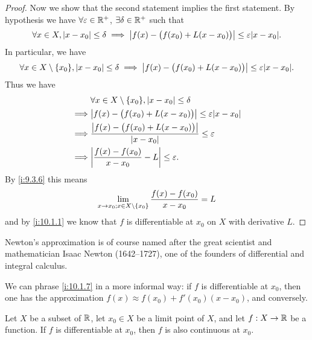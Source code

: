 \begin{proof}
  Now we show that the second statement implies the first statement.
  By hypothesis we have \(\forall \varepsilon \in \mathbb{R}^+\), \(\exists \delta \in \mathbb{R}^+\) such that
  \[
    \forall x \in X, \abs{x - x_0} \leq \delta \implies \abs{f(x) - \big(f(x_0) + L(x - x_0)\big)} \leq \varepsilon \abs{x - x_0}.
  \]
  In particular, we have
  \[
    \forall x \in X \setminus \set{x_0}, \abs{x - x_0} \leq \delta \implies \abs{f(x) - \big(f(x_0) + L(x - x_0)\big)} \leq \varepsilon \abs{x - x_0}.
  \]
  Thus we have
  \begin{align*}
             & \forall x \in X \setminus \set{x_0}, \abs{x - x_0} \leq \delta                     \\
    \implies & \abs{f(x) - \big(f(x_0) + L(x - x_0)\big)} \leq \varepsilon \abs{x - x_0}          \\
    \implies & \dfrac{\abs{f(x) - \big(f(x_0) + L(x - x_0)\big)}}{\abs{x - x_0}} \leq \varepsilon \\
    \implies & \abs{\dfrac{f(x) - f(x_0)}{x - x_0} - L} \leq \varepsilon.
  \end{align*}
  By \cref{i:9.3.6} this means
  \[
    \lim_{x \to x_0 ; x \in X \setminus \left\lbrace x_0\right\rbrace} \dfrac{f(x) - f(x_0)}{x - x_0} = L
  \]
  and by \cref{i:10.1.1} we know that \(f\) is differentiable at \(x_0\) on \(X\) with derivative \(L\).
\end{proof}

\begin{rmk}\label{i:10.1.8}
  Newton's approximation is of course named after the great scientist and mathematician Isaac Newton (1642--1727), one of the founders of differential and integral calculus.
\end{rmk}

\begin{rmk}\label{i:10.1.9}
  We can phrase \cref{i:10.1.7} in a more informal way:
  if \(f\) is differentiable at \(x_0\), then one has the approximation \(f(x) \approx f(x_0) + f'(x_0)(x - x_0)\), and conversely.
\end{rmk}

\begin{prop}\label{i:10.1.10}
  Let \(X\) be a subset of \(\mathbb{R}\), let \(x_0 \in X\) be a limit point of \(X\), and let \(f : X \to \mathbb{R}\) be a function.
  If \(f\) is differentiable at \(x_0\), then \(f\) is also continuous at \(x_0\).
\end{prop}


